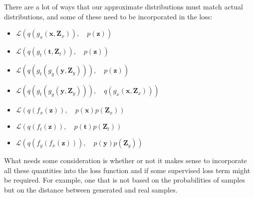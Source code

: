 \documentclass{article}
\newcommand{\Loss}{\mathcal{L}}
\newcommand{\bt}{\mathbf{t}}
\newcommand{\bx}{\mathbf{x}}
\newcommand{\by}{\mathbf{y}}
\newcommand{\bZ}{\mathbf{Z}}
\newcommand{\bz}{\mathbf{z}}
\begin{document}
There are a lot of ways that our approximate distributions must match actual distributions, and some of these need to be incorporated in the loss:
\begin{itemize}
    \item $\Loss(q(g_x(\bx, \bZ_x)),\quad p(\bz))$
    \item $\Loss(q(g_t(\bt, \bZ_t)),\quad p(\bz))$
    \item $\Loss(q(g_t(g_y(\by, \bZ_y))),\quad p(\bz))$
    \item $\Loss(q(g_t(g_y(\by, \bZ_y))),\quad q(g_x(\bx, \bZ_x)))$
    \vspace{0.5cm}
    \item $\Loss(q(f_x(\bz)),\quad p(\bx)p(\bZ_x))$
    \item $\Loss(q(f_t(\bz)),\quad p(\bt)p(\bZ_t))$
    \item $\Loss(q(f_y(f_x(\bz))),\quad p(\by)p(\bZ_y))$
\end{itemize}

What needs some consideration is whether or not it makes sense to incorporate all these quantities into the loss function and if some supervised loss term might be required. For example, one that is not based on the probabilities of samples but on the distance between generated and real samples.





\end{document}

